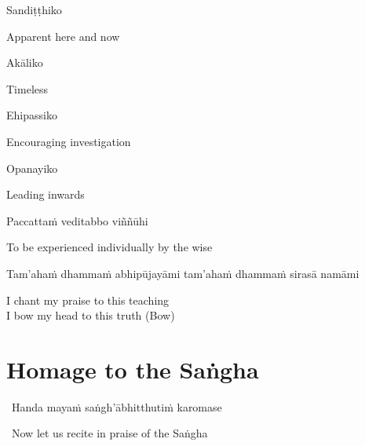 Sandiṭṭhiko

\begin{english}
  Apparent here and now
\end{english}

Akāliko

\begin{english}
  Timeless
\end{english}

Ehipassiko

\begin{english}
  Encouraging investigation
\end{english}

Opanayiko

\begin{english}
  Leading inwards
\end{english}

Paccattaṁ veditabbo viññūhi

\begin{english}
  To be experienced individually by the wise
\end{english}

\suttaRef{[SN 12.41]}

\begin{pali-hang}
  Tam'ahaṁ dhammaṁ abhipūjayāmi tam'ahaṁ dhammaṁ sirasā namāmi
\end{pali-hang}

\begin{english}
  I chant my praise to this teaching\\
  I bow my head to this truth \hfill{(Bow)}
\end{english}

\suttaRef{[Trad]}

\section{Homage to the Saṅgha}
\label{homage-sangha}

\begin{leader}
  \anglebracketleft\ \hspace{-0.5mm}Handa mayaṁ saṅgh'ābhitthutiṁ karomase \hspace{-0.5mm}\anglebracketright\
\end{leader}
\begin{leader-english-belowpali}
  \anglebracketleft\ \hspace{-0.5mm}Now let us recite in praise of the Saṅgha \hspace{-0.5mm}\anglebracketright\
\end{leader-english-belowpali}

